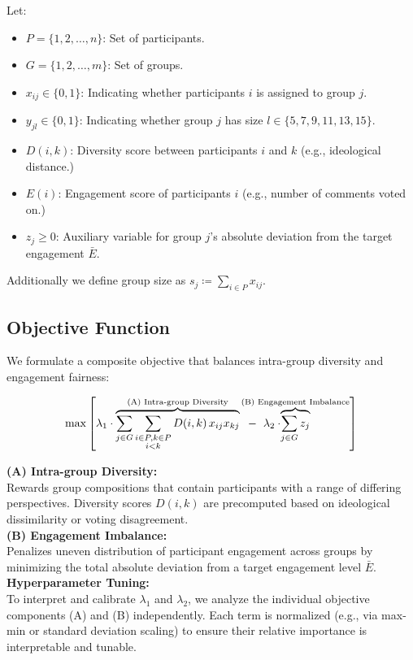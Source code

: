 Let:
\begin{itemize}
    \item $P = \{1, 2, \dots, n\}$: Set of participants.
    \item $G = \{1, 2, \dots, m\}$: Set of groups.
    \item $x_{ij} \in \{0,1\}$: Indicating whether participants $i$ is assigned to group $j$.
    \item $y_{jl} \in \{0,1\}$: Indicating whether group $j$ has size $l \in \{5,7,9,11,13,15\}$.
    \item $D(i,k)$: Diversity score between participants $i$ and $k$ (e.g., ideological distance.)
    \item $E(i)$: Engagement score of participants $i$ (e.g., number of comments voted on.)
    \item $z_j \geq 0$: Auxiliary variable for group $j$’s absolute deviation from the target engagement $\bar{E}$.
\end{itemize}

\noindent
Additionally we define group size as $s_j \coloneqq \sum_{i \in P} x_{ij}$.

\subsection*{Objective Function}

We formulate a composite objective that balances intra-group diversity and engagement fairness:

\[
\max \left[
\lambda_1 \cdot \overbrace{
\sum_{j \in G} \sum_{\substack{i \in P, k \in P \\ i < k}} D(i,k)\,x_{ij} x_{kj}
  }^{\text{(A) Intra-group Diversity}}
\hspace{0.2cm} - \hspace{0.2cm} \lambda_2 \cdot \hspace{-1.3cm} \overbrace{
\sum_{j \in G} z_j
}^{\text{(B) Engagement Imbalance}}
\right]
\]

\noindent
\textbf{(A) Intra-group Diversity:}\\[3pt]
Rewards group compositions that contain participants with a range of differing perspectives.
Diversity scores \(D(i,k)\) are precomputed based on ideological dissimilarity or voting disagreement.
\\
\textbf{(B) Engagement Imbalance:}\\[3pt]
Penalizes uneven distribution of participant engagement across groups by minimizing the total absolute deviation
from a target engagement level \(\bar{E}\).
\\
\textbf{Hyperparameter Tuning:}\\[3pt]
To interpret and calibrate \(\lambda_1\) and \(\lambda_2\), we analyze the individual objective components (A)
and (B) independently.
Each term is normalized (e.g., via max-min or standard deviation scaling)
to ensure their relative importance is interpretable and tunable.

